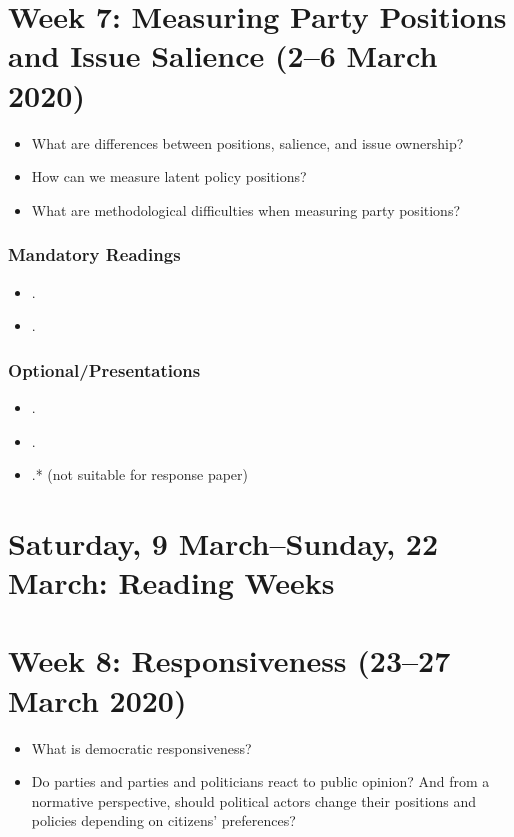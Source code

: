 \documentclass[abstract=on,parskip=full,headings=standardclasses,fontsize=11pt,paper=a4]{scrartcl}
\begin{document}
\section{Week 7:   Measuring Party Positions and Issue Salience (2--6 March 2020)}


\begin{itemize}
\renewcommand\labelitemi{--}
\item What are differences between positions, salience, and issue ownership?
\item How can we measure latent policy positions? 
\item What are methodological difficulties when measuring party positions?
\end{itemize}

\subsubsection*{Mandatory Readings}
\begin{itemize}
\item {}.
\item {}.
\end{itemize}


\subsubsection*{Optional/Presentations}
\begin{itemize}
\item {}.
\item {}.
\item {}.*  (not suitable for response paper)
\end{itemize}


\section{Saturday, 9 March--Sunday, 22 March: Reading Weeks}


\section{Week 8:  Responsiveness (23--27 March 2020)}

\begin{itemize}
\renewcommand\labelitemi{--}
\item What is democratic responsiveness?
\item Do parties and parties and politicians react to public opinion?  And from a normative perspective, should political actors change their positions and policies depending on citizens' preferences?
\end{itemize}
\end{document}
